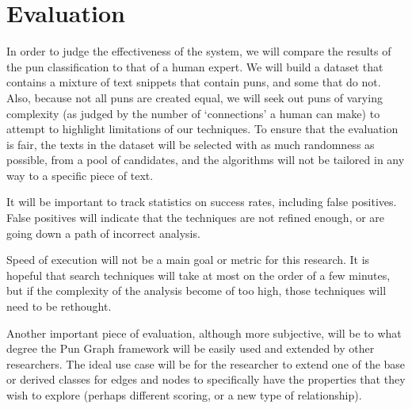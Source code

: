 \section{Evaluation}

In order to judge the effectiveness of the system, we will compare the results of the pun classification to that of a human expert. We will build a dataset that contains a mixture of text snippets that contain puns, and some that do not. Also, because not all puns are created equal, we will seek out puns of varying complexity (as judged by the number of `connections' a human can make) to attempt to highlight limitations of our techniques. To ensure that the evaluation is fair, the texts in the dataset will be selected with as much randomness as possible, from a pool of candidates, and the algorithms will not be tailored in any way to a specific piece of text.

It will be important to track statistics on success rates, including false positives. False positives will indicate that the techniques are not refined enough, or are going down a path of incorrect analysis.

Speed of execution will not be a main goal or metric for this research. It is hopeful that search techniques will take at most on the order of a few minutes, but if the complexity of the analysis become of too high, those techniques will need to be rethought.

Another important piece of evaluation, although more subjective, will be to what degree the Pun Graph framework will be easily used and extended by other researchers.  The ideal use case will be for the researcher to extend one of the base or derived classes for edges and nodes to specifically have the properties that they wish to explore (perhaps different scoring, or a new type of relationship).

